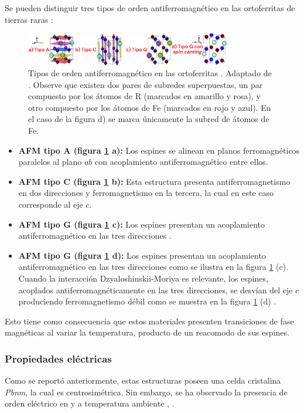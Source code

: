 \documentclass[../main.tex]{subfiles}
\begin{document}
Se pueden distinguir tres tipos de orden antiferromagnético en las ortoferritas de tierras raras \cite{KamalWarshi2018}:
\begin{figure}[H]
    \centering
    \includegraphics[width=0.8\textwidth]{fig/tiposAFM.png}
    \caption{Tipos de orden antiferromagnético en las ortoferritas . Adaptado de \cite{Wang2019}. Observe que existen dos pares de subredes superpuestas, un par compuesto por los átomos de R (marcados en amarillo y rosa), y otro compuesto por los átomos de Fe (marcados en rojo y azul). En el caso de la figura d) se marca únicamente la subred de átomos de Fe.}
    \label{fig:tiposAFM}
\end{figure}
\begin{itemize}
    \item \textbf{AFM tipo A (figura \ref{fig:tiposAFM} a):} Los espines se alinean en planos ferromagnéticos paralelos al plano $ab$ con acoplamiento antiferromagnético entre ellos.
    \item \textbf{AFM tipo C (figura \ref{fig:tiposAFM} b):} Esta estructura presenta antiferromagnetismo en dos direcciones y ferromagnetismo en la tercera, la cual en este caso corresponde al eje $c$.
    \item \textbf{AFM tipo G (figura \ref{fig:tiposAFM} c):} Los espines presentan un acoplamiento antiferromagnético en las tres direcciones \cite{Dagotto}.
    \item \textbf{AFM tipo G (figura \ref{fig:tiposAFM} d):} Los espines presentan un acoplamiento antiferromagnético en las tres direcciones como se ilustra en la figura \ref{fig:tiposAFM} (c). Cuando la interacción Dzyaloshinskii-Moriya es relevante, los espines, acoplados antiferromagnéticamente en las tres direcciones, se desvían del eje $c$ produciendo ferromagnetismo débil como se muestra en la figura \ref{fig:tiposAFM} (d) \cite{Dagotto} \cite{Wang2019}.
\end{itemize}
Esto tiene como consecuencia que estos materiales presenten transiciones de fase magnéticas al variar la temperatura, producto de un reacomodo de sus espines.

\subsubsection{Propiedades eléctricas}
Como se reportó anteriormente, estas estructuras poseen una celda cristalina \textit{Pbnm}, la cual es centrosimétrica. Sin embargo, se ha observado la presencia de orden eléctrico en \sama{} y \neod{} a temperatura ambiente \cite{Rajaitha2022}, \cite{Zhang2016}.
\end{document}
